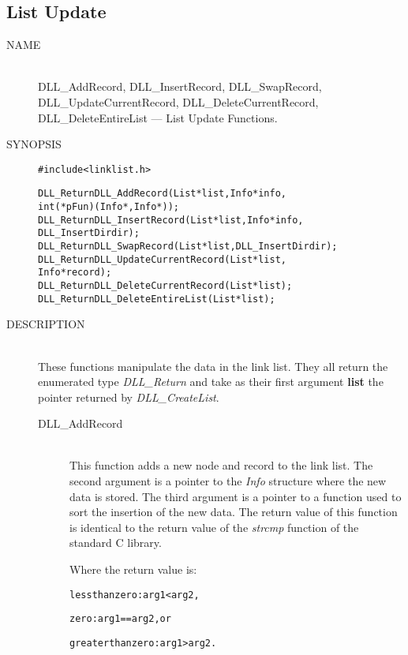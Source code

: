 \documentclass[10pt,letterpaper,titlepage]{article}
\begin{document}
\subsection{List Update}
\begin{description}
\item[NAME]\quad\\
DLL\_AddRecord, DLL\_InsertRecord, DLL\_SwapRecord,\\
DLL\_UpdateCurrentRecord, DLL\_DeleteCurrentRecord,\\
DLL\_DeleteEntireList --- List Update Functions.

\item[SYNOPSIS]
\begin{alltt}

#include <linklist.h>

DLL_Return DLL_AddRecord(List *list, Info *info,
            int (*pFun)(Info *, Info *));
DLL_Return DLL_InsertRecord(List *list, Info *info,
            DLL_InsertDir dir);
DLL_Return DLL_SwapRecord(List *list, DLL_InsertDir dir);
DLL_Return DLL_UpdateCurrentRecord(List *list,
            Info *record);
DLL_Return DLL_DeleteCurrentRecord(List *list);
DLL_Return DLL_DeleteEntireList(List *list);
\end{alltt}

\item[DESCRIPTION]\quad\\
These functions manipulate the data in the link list.  They all return the enumerated type \emph{DLL\_Return} and take as their first argument \textbf{list} the pointer returned by \emph{DLL\_CreateList}.

 \begin{description}
 \item[DLL\_AddRecord]\quad\\
 This function adds a new node and record to the link list.  The second argument is a pointer to the \emph{Info} structure where the new data is stored.  The third argument is a pointer to a function used to sort the insertion of the new data.  The return value of this function is identical to the return value of the \emph{strcmp} function of the standard C library.
 \vspace{8pt}

 Where the return value is:
 \begin{alltt}
   less than zero:     arg1 < arg2,

   zero:               arg1 == arg2, or

   greater than zero:  arg1 > arg2.
 \end{alltt}


\end{description}
\end{description}
\end{document}
